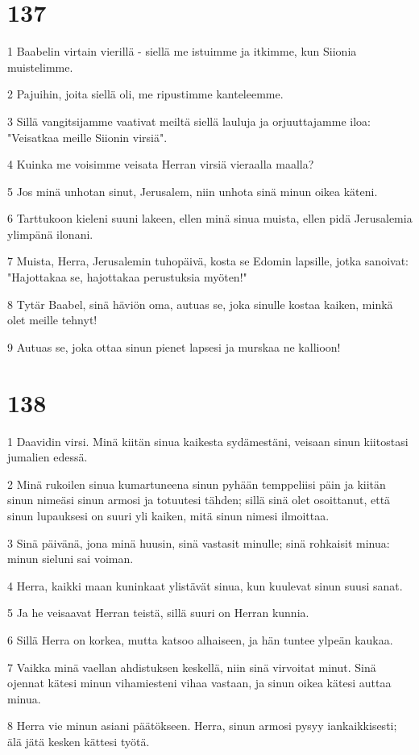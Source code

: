 \chapter{137}

\par 1 Baabelin virtain vierillä - siellä me istuimme ja itkimme, kun Siionia muistelimme.
\par 2 Pajuihin, joita siellä oli, me ripustimme kanteleemme.
\par 3 Sillä vangitsijamme vaativat meiltä siellä lauluja ja orjuuttajamme iloa: "Veisatkaa meille Siionin virsiä".
\par 4 Kuinka me voisimme veisata Herran virsiä vieraalla maalla?
\par 5 Jos minä unhotan sinut, Jerusalem, niin unhota sinä minun oikea käteni.
\par 6 Tarttukoon kieleni suuni lakeen, ellen minä sinua muista, ellen pidä Jerusalemia ylimpänä ilonani.
\par 7 Muista, Herra, Jerusalemin tuhopäivä, kosta se Edomin lapsille, jotka sanoivat: "Hajottakaa se, hajottakaa perustuksia myöten!"
\par 8 Tytär Baabel, sinä häviön oma, autuas se, joka sinulle kostaa kaiken, minkä olet meille tehnyt!
\par 9 Autuas se, joka ottaa sinun pienet lapsesi ja murskaa ne kallioon!

\chapter{138}

\par 1 Daavidin virsi. Minä kiitän sinua kaikesta sydämestäni, veisaan sinun kiitostasi jumalien edessä.
\par 2 Minä rukoilen sinua kumartuneena sinun pyhään temppeliisi päin ja kiitän sinun nimeäsi sinun armosi ja totuutesi tähden; sillä sinä olet osoittanut, että sinun lupauksesi on suuri yli kaiken, mitä sinun nimesi ilmoittaa.
\par 3 Sinä päivänä, jona minä huusin, sinä vastasit minulle; sinä rohkaisit minua: minun sieluni sai voiman.
\par 4 Herra, kaikki maan kuninkaat ylistävät sinua, kun kuulevat sinun suusi sanat.
\par 5 Ja he veisaavat Herran teistä, sillä suuri on Herran kunnia.
\par 6 Sillä Herra on korkea, mutta katsoo alhaiseen, ja hän tuntee ylpeän kaukaa.
\par 7 Vaikka minä vaellan ahdistuksen keskellä, niin sinä virvoitat minut. Sinä ojennat kätesi minun vihamiesteni vihaa vastaan, ja sinun oikea kätesi auttaa minua.
\par 8 Herra vie minun asiani päätökseen. Herra, sinun armosi pysyy iankaikkisesti; älä jätä kesken kättesi työtä.

